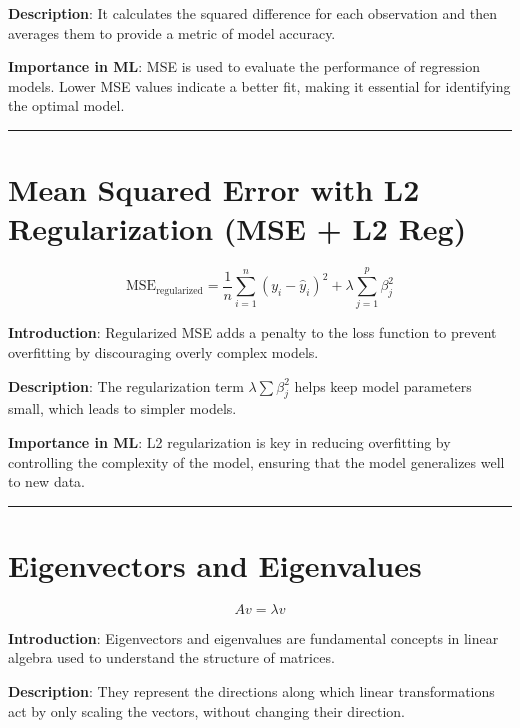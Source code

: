 \documentclass[
  12 pt,
  a4paper,
]{book}
\numberwithin{equation}{section}
\theoremstyle{plain}      %
\theoremstyle{definition} %
\theoremstyle{remark}     %
\theoremstyle{note}         %
\begin{document}
\textbf{Description}: It calculates the squared difference for each
observation and then averages them to provide a metric of model
accuracy.

\textbf{Importance in ML}: MSE is used to evaluate the performance of
regression models. Lower MSE values indicate a better fit, making it
essential for identifying the optimal model.

\begin{center}\rule{0.5\linewidth}{0.5pt}\end{center}

\newpage

\hypertarget{mean-squared-error-with-l2-regularization-mse-l2-reg}{%
\chapter{Mean Squared Error with L2 Regularization (MSE + L2
Reg)}\label{mean-squared-error-with-l2-regularization-mse-l2-reg}}

\[
\text{MSE}_{\text{regularized}} = \frac{1}{n} \sum_{i=1}^n (y_i - \hat{y}_i)^2 + \lambda \sum_{j=1}^p \beta_j^2
\]

\textbf{Introduction}: Regularized MSE adds a penalty to the loss
function to prevent overfitting by discouraging overly complex models.

\textbf{Description}: The regularization term \(\lambda \sum \beta_j^2\)
helps keep model parameters small, which leads to simpler models.

\textbf{Importance in ML}: L2 regularization is key in reducing
overfitting by controlling the complexity of the model, ensuring that
the model generalizes well to new data.

\begin{center}\rule{0.5\linewidth}{0.5pt}\end{center}

\newpage

\hypertarget{eigenvectors-and-eigenvalues}{%
\chapter{Eigenvectors and
Eigenvalues}\label{eigenvectors-and-eigenvalues}}

\[
A v = \lambda v
\]

\textbf{Introduction}: Eigenvectors and eigenvalues are fundamental
concepts in linear algebra used to understand the structure of matrices.

\textbf{Description}: They represent the directions along which linear
transformations act by only scaling the vectors, without changing their
direction.
\end{document}
